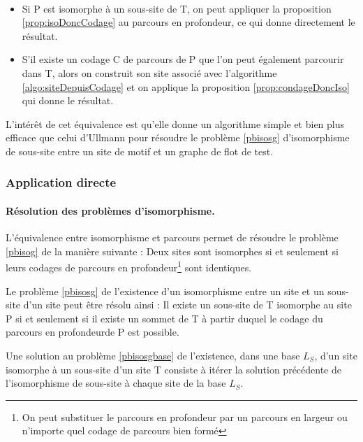 \begin{pr}
~
 \begin{itemize}
  \item Si P est isomorphe à un sous-site de T, on peut appliquer la proposition \ref{prop:isoDoncCodage} au parcours en profondeur, ce qui donne directement le résultat.
  \item S'il existe un codage C de parcours de P que l'on peut également parcourir dans T, alors on construit son site associé avec l'algorithme \ref{algo:siteDepuisCodage} et on applique la proposition \ref{prop:condageDoncIso} qui donne le résultat.
 \end{itemize}
\end{pr}

L'intérêt de cet équivalence est qu'elle donne un algorithme simple et bien plus efficace que celui d'Ullmann pour résoudre le problème \ref{pbisosg} d'isomorphisme de sous-site entre un site de motif et un graphe de flot de test.

\subsubsection{Application directe}
\paragraph{Résolution des problèmes d'isomorphisme.}
L'équivalence entre isomorphisme et parcours permet de résoudre le problème \ref{pbisog} de la manière suivante :
Deux sites sont isomorphes si et seulement si leurs codages de parcours en profondeur\footnote{On peut substituer le parcours en profondeur par un parcours en largeur ou n'importe quel codage de parcours bien formé} sont identiques.

Le problème \ref{pbisosg} de l'existence d'un isomorphisme entre un site et un sous-site d'un site peut être résolu ainsi :
Il existe un sous-site de T isomorphe au site P si et seulement si il existe un sommet de T à partir duquel le codage du parcours en profondeur\footnotemark[\value{footnote}] de P est possible.

Une solution au problème \ref{pbisosgbase} de l'existence, dans une base $L_S$, d'un site isomorphe à un sous-site d'un site T consiste à itérer la solution précédente de l'isomorphisme de sous-site à chaque site de la base $L_S$.


